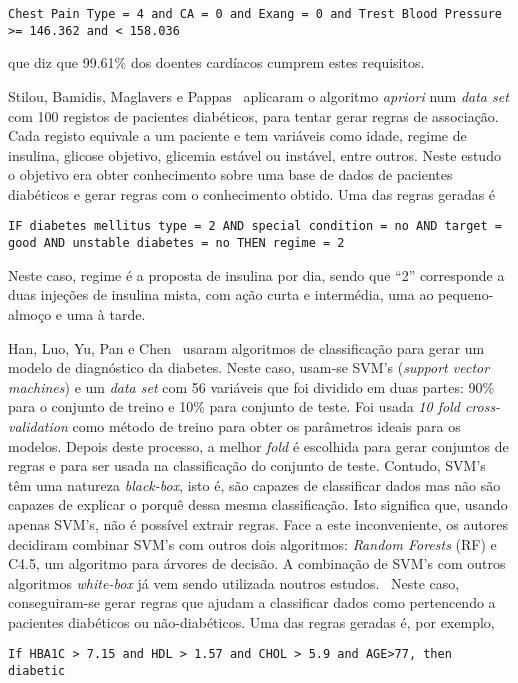 \begin{lstlisting}
Chest Pain Type = 4 and CA = 0 and Exang = 0 and Trest Blood Pressure >= 146.362 and < 158.036
\end{lstlisting}
que diz que 99.61\% dos doentes cardíacos cumprem estes requisitos. 

Stilou, Bamidis, Maglavers e Pappas~\cite{association} aplicaram o algoritmo \textit{apriori} num \textit{data set} com 100 registos de pacientes diabéticos, para tentar gerar regras de associação. Cada registo equivale a um paciente e tem variáveis como idade, regime de insulina, glicose objetivo, glicemia estável ou instável, entre outros. 
Neste estudo o objetivo era obter conhecimento sobre uma base de dados de pacientes diabéticos e gerar regras com o conhecimento obtido.
Uma das regras geradas é 
\begin{lstlisting}
IF diabetes mellitus type = 2 AND special condition = no AND target = good AND unstable diabetes = no THEN regime = 2
\end{lstlisting}
Neste caso, regime é a proposta de insulina por dia, sendo que ``2'' corresponde a duas injeções de insulina mista, com ação curta e intermédia, uma ao pequeno-almoço e uma à tarde. 

Han, Luo, Yu, Pan e Chen~\cite{svm} usaram algoritmos de classificação para gerar um modelo de diagnóstico da diabetes. Neste caso, usam-se SVM's (\textit{support vector machines}) e um \textit{data set} com 56 variáveis que foi dividido em duas partes: 90\% para o conjunto de treino e 10\% para conjunto de teste. Foi usada \textit{10 fold cross-validation} como método de treino para obter os parâmetros ideais para os modelos. Depois deste processo, a melhor \textit{fold} é escolhida para gerar conjuntos de regras e para ser usada na classificação do conjunto de teste. Contudo, SVM's têm uma natureza \textit{black-box}, isto é, 	são capazes de classificar dados mas não são capazes de explicar o porquê dessa mesma classificação. Isto significa que, usando apenas SVM's, não é possível extrair regras. Face a este inconveniente, os autores decidiram combinar SVM's com outros dois algoritmos: \textit{Random Forests} (RF) e C4.5, um algoritmo para árvores de decisão. A combinação de SVM's com outros algoritmos \textit{white-box} já vem sendo utilizada noutros estudos.~\cite{svm1, svm2} Neste caso, conseguiram-se gerar regras que ajudam a classificar dados como pertencendo a pacientes diabéticos ou não-diabéticos. Uma das regras geradas é, por exemplo, 
\begin{lstlisting}
If HBA1C > 7.15 and HDL > 1.57 and CHOL > 5.9 and AGE>77, then diabetic
\end{lstlisting}

